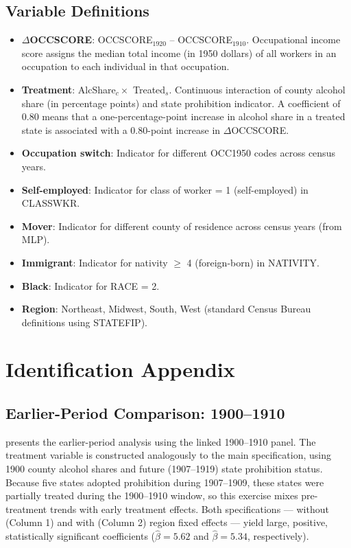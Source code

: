 \documentclass[12pt]{article}
\begin{document}
\subsection{Variable Definitions}

\begin{itemize}
    \item \textbf{$\Delta$OCCSCORE}: OCCSCORE$_{1920}$ -- OCCSCORE$_{1910}$. Occupational income score assigns the median total income (in 1950 dollars) of all workers in an occupation to each individual in that occupation.
    \item \textbf{Treatment}: AlcShare$_c \times$ Treated$_s$. Continuous interaction of county alcohol share (in percentage points) and state prohibition indicator. A coefficient of 0.80 means that a one-percentage-point increase in alcohol share in a treated state is associated with a 0.80-point increase in $\Delta$OCCSCORE.
    \item \textbf{Occupation switch}: Indicator for different OCC1950 codes across census years.
    \item \textbf{Self-employed}: Indicator for class of worker = 1 (self-employed) in CLASSWKR.
    \item \textbf{Mover}: Indicator for different county of residence across census years (from MLP).
    \item \textbf{Immigrant}: Indicator for nativity $\geq$ 4 (foreign-born) in NATIVITY.
    \item \textbf{Black}: Indicator for RACE = 2.
    \item \textbf{Region}: Northeast, Midwest, South, West (standard Census Bureau definitions using STATEFIP).
\end{itemize}


\section{Identification Appendix}
\label{app:identification}

\subsection{Earlier-Period Comparison: 1900--1910}

 presents the earlier-period analysis using the linked 1900--1910 panel. The treatment variable is constructed analogously to the main specification, using 1900 county alcohol shares and future (1907--1919) state prohibition status. Because five states adopted prohibition during 1907--1909, these states were partially treated during the 1900--1910 window, so this exercise mixes pre-treatment trends with early treatment effects. Both specifications --- without (Column 1) and with (Column 2) region fixed effects --- yield large, positive, statistically significant coefficients ($\hat{\beta} = 5.62$ and $\hat{\beta} = 5.34$, respectively).
\end{document}
